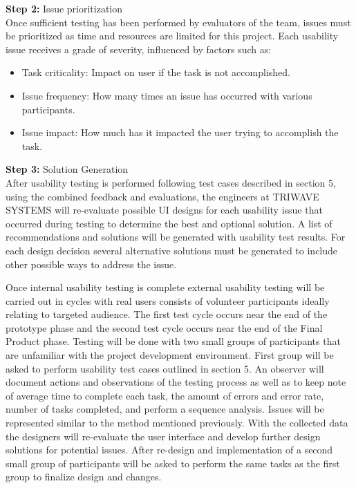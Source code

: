 \textbf{Step 2:} Issue prioritization\\
\medskip
Once sufficient testing has been performed by evaluators of the team, issues must be prioritized as time and resources are limited for this project. Each usability issue receives a grade of severity, influenced by factors such as:
\begin{itemize}
\setlength\itemsep{0.1mm}
	\item Task criticality: Impact on user if the task is not accomplished.
	\item Issue frequency: How many times an issue has occurred with various participants.
	\item Issue impact: How much has it impacted the user trying to accomplish the task.
\end{itemize}

\bigskip



\textbf{Step 3:} Solution Generation\\
\medskip
After usability testing is performed following test cases described in section 5, using the combined feedback and evaluations, the engineers at TRIWAVE SYSTEMS will re-evaluate possible UI designs for each usability issue that occurred during testing to determine the best and optional solution. A list of recommendations and solutions will be generated with usability test results. For each design decision several alternative solutions must be generated to include other possible ways to address the issue. 

\pagebreak

Once internal usability testing is complete external usability testing will be carried out in cycles with real users consists of volunteer participants ideally relating to targeted audience. The first test cycle occurs near the end of the prototype phase and the second test cycle occurs near the end of the Final Product phase. Testing will be done with two small groups of participants that are unfamiliar with the project development environment. First group will be asked to perform usability test cases outlined in section 5. An observer will document actions and observations of the testing process as well as to keep note of average time to complete each task, the amount of errors and error rate, number of tasks completed, and perform a sequence analysis. Issues will be represented similar to the method mentioned previously. With the collected data the designers will re-evaluate the user interface and develop further design solutions for potential issues. After re-design and implementation of a second small group of participants will be asked to perform the same tasks as the first group to finalize design and changes.

